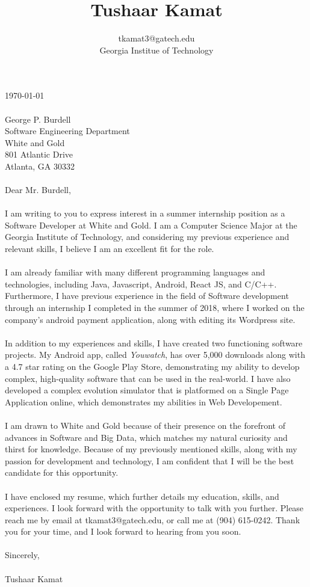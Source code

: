 \documentclass[11pt]{article}
\title{Tushaar Kamat \vspace{-1em}}
\author{\normalfont \normalsize tkamat3@gatech.edu\vspace{-.5em}\\ \normalfont \normalsize Georgia Institue of Technology}
\date{}
\begin{document}
\maketitle
\vspace{-1.5em}
\noindent \today\\
\\
George P. Burdell\\
Software Engineering Department\\
White and Gold\\
801 Atlantic Drive\\ 
Atlanta, GA 30332\\
\\
Dear Mr. Burdell,\\
\\
\noindent I am writing to you to express interest in a summer internship
position as a Software Developer at White and Gold. I am a Computer Science
Major at the Georgia Institute of Technology, and considering my previous
experience and relevant skills, I believe I am an excellent fit for the role.
\\\\
\noindent I am already familiar with many different programming languages and
technologies, including Java, Javascript, Android, React JS, and C/C++.
Furthermore, I have previous experience in the field of Software development
through an internship I completed in the summer of 2018, where I worked on the
company's android payment application, along with editing its Wordpress site.
\\\\
\noindent In addition to my experiences and skills, I have created two functioning
software projects. My Android app, called \textit{Youwatch}, has over 5,000
downloads along with a 4.7 star rating on the Google Play Store, demonstrating
my ability to develop complex, high-quality software that can be used in the
real-world. I have also developed a complex evolution simulator that is
platformed on a Single Page Application online, which demonstrates my abilities
in Web Developement.
\\\\
\noindent I am drawn to White and Gold because of their presence on the forefront of
advances in Software and Big Data, which matches my natural curiosity and thirst
for knowledge. Because of my previously mentioned skills, along with my passion
for development and technology, I am confident that I will be the best candidate
for this opportunity.
\\\\
I have enclosed my resume, which further details my education, skills, and
experiences. I look forward with the opportunity to talk with you further.
Please reach me by email at tkamat3@gatech.edu, or call me at (904) 615-0242.
Thank you for your time, and I look forward to hearing from you soon.
\\
\\
Sincerely,
\\
\\
Tushaar Kamat
\end{document}
